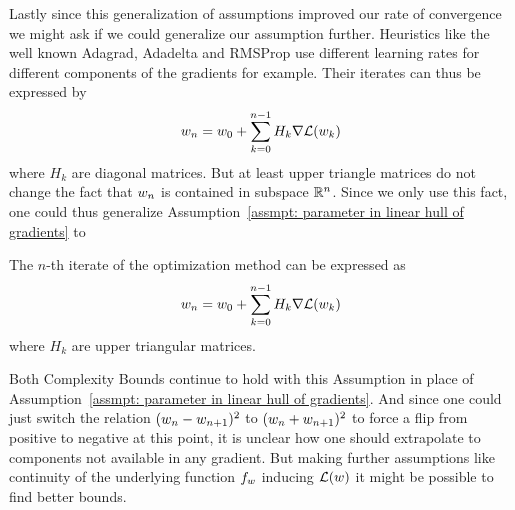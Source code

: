 Lastly since this generalization of assumptions improved our rate of convergence
we might ask if we could generalize our assumption further. Heuristics like
the well known Adagrad, Adadelta and RMSProp use different learning rates for
different components of the gradients for example. Their iterates can thus
be expressed by
%
\begin{align*}
	w_n = w_0 + \sum_{k=0}^{n-1} H_k \nabla\mathcal{L}(w_k)
\end{align*}
%
where \(H_k\) are diagonal matrices. But at least upper triangle matrices do
not change the fact that \(w_n\) is contained in subspace \(\mathbb{R}^n\).
Since we only use this fact, one could thus generalize Assumption~\ref{assmpt:
parameter in linear hull of gradients} to
%
\begin{assumption}\label{assmpt: parameter in generalized linear hull of gradients}
	The \(n\)-th iterate of the optimization method can be expressed as
	\begin{align*}
		w_n = w_0 + \sum_{k=0}^{n-1} H_k \nabla\mathcal{L}(w_k)
	\end{align*}
	where \(H_k\) are upper triangular matrices.
\end{assumption}

Both Complexity Bounds continue to hold with this Assumption in place of
Assumption~\ref{assmpt: parameter in linear hull of gradients}. And since one
could just switch the relation \((w_n-w_{n+1})^2\) to
\((w_n+w_{n+1})^2\) to force a flip from positive to negative
at this point, it is unclear how one should extrapolate to components not
available in any gradient. But making further assumptions like continuity of
the underlying function \(f_{w}\) inducing \(\mathcal{L}(w)\) it might
be possible to find better bounds.



\endinput